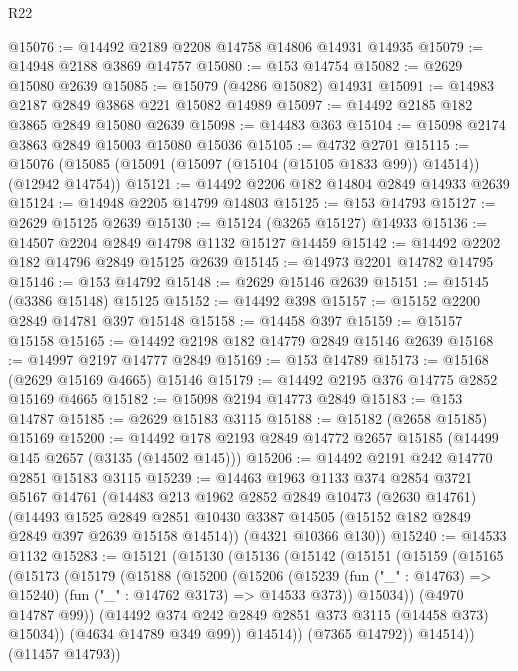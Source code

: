\begin{lexlean}{R22}
\begin{coremodule}
@15076 := @14492 @2189 @2208 @14758 @14806 @14931 @14935
@15079 := @14948 @2188 @3869 @14757
@15080 := @153 @14754
@15082 := @2629 @15080 @2639
@15085 := @15079 (@4286 @15082) @14931
@15091 := @14983 @2187 @2849 @3868 @221 @15082 @14989
@15097 := @14492 @2185 @182 @3865 @2849 @15080 @2639
@15098 := @14483 @363
@15104 := @15098 @2174 @3863 @2849 @15003 @15080 @15036
@15105 := @4732 @2701
@15115 := @15076 (@15085 (@15091 (@15097 (@15104 (@15105 @1833 @99)) @14514)) (@12942 @14754))
@15121 := @14492 @2206 @182 @14804 @2849 @14933 @2639
@15124 := @14948 @2205 @14799 @14803
@15125 := @153 @14793
@15127 := @2629 @15125 @2639
@15130 := @15124 (@3265 @15127) @14933
@15136 := @14507 @2204 @2849 @14798 @1132 @15127 @14459
@15142 := @14492 @2202 @182 @14796 @2849 @15125 @2639
@15145 := @14973 @2201 @14782 @14795
@15146 := @153 @14792
@15148 := @2629 @15146 @2639
@15151 := @15145 (@3386 @15148) @15125
@15152 := @14492 @398
@15157 := @15152 @2200 @2849 @14781 @397 @15148
@15158 := @14458 @397
@15159 := @15157 @15158
@15165 := @14492 @2198 @182 @14779 @2849 @15146 @2639
@15168 := @14997 @2197 @14777 @2849
@15169 := @153 @14789
@15173 := @15168 (@2629 @15169 @4665) @15146
@15179 := @14492 @2195 @376 @14775 @2852 @15169 @4665
@15182 := @15098 @2194 @14773 @2849
@15183 := @153 @14787
@15185 := @2629 @15183 @3115
@15188 := @15182 (@2658 @15185) @15169
@15200 := @14492 @178 @2193 @2849 @14772 @2657 @15185 (@14499 @145 @2657 (@3135 (@14502 @145)))
@15206 := @14492 @2191 @242 @14770 @2851 @15183 @3115
@15239 := @14463
    @1963
    @1133
    @374
    @2854
    @3721
    @5167
    @14761
    (@14483
      @213
      @1962
      @2852
      @2849
      @10473
      (@2630 @14761)
      (@14493
        @1525
        @2849
        @2851
        @10430
        @3387
        @14505
        (@15152 @182 @2849 @2849 @397 @2639 @15158 @14514))
      (@4321 @10366 @130))
@15240 := @14533 @1132
@15283 := @15121
    (@15130
      (@15136
        (@15142
          (@15151
            (@15159
              (@15165
                (@15173
                  (@15179
                    (@15188
                      (@15200
                        (@15206
                          (@15239
                            (fun ("_" : @14763) => @15240)
                            (fun ("_" : @14762 @3173) => @14533 @373))
                          @15034))
                      (@4970 @14787 @99))
                    (@14492 @374 @242 @2849 @2851 @373 @3115 (@14458 @373) @15034))
                  (@4634 @14789 @349 @99))
                @14514))
            (@7365 @14792))
          @14514))
      (@11457 @14793))

\end{coremodule}
\end{lexlean}
